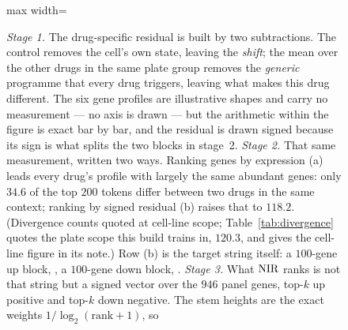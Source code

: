 \begin{figure}[htbp]
\begin{fullwidth}
\begin{adjustbox}{max width=\linewidth}
\end{adjustbox}
\caption[The residual, the target string and the scored vector]{
\emph{Stage 1.} The drug-specific residual is built by two subtractions. The
control removes the cell's own state, leaving the \emph{shift}; the mean over
the other drugs in the same plate group removes the \emph{generic} programme
that every drug triggers, leaving what makes this drug different. The six
gene profiles are illustrative shapes and carry no measurement --- no axis is
drawn --- but the arithmetic within the figure is exact bar by bar, and the
residual is drawn signed because its sign is what splits the two blocks in
stage~2. \emph{Stage 2.} That same measurement, written two ways. Ranking genes
by expression (a) leads every drug's profile with largely the same abundant
genes: only $34.6$ of the top $200$ tokens differ between two drugs in the same
context; ranking by signed residual
(b) raises that to $118.2$. (Divergence counts quoted at cell-line scope; Table~\ref{tab:divergence} quotes the plate scope this build trains in, $120.3$, and gives the cell-line figure in its note.) Row (b) is the
target string itself: a $100$-gene up block, \DOWN, a $100$-gene down block,
\ENDCELL. \emph{Stage 3.} What $\textrm{NIR}$ ranks is not that string but a signed
vector over the $946$ panel genes, top-$k$ up positive and top-$k$ down
negative. The stem heights are the exact weights $1/\log_2(\textrm{rank}+1)$, so
}
\end{fullwidth}
\end{figure}
